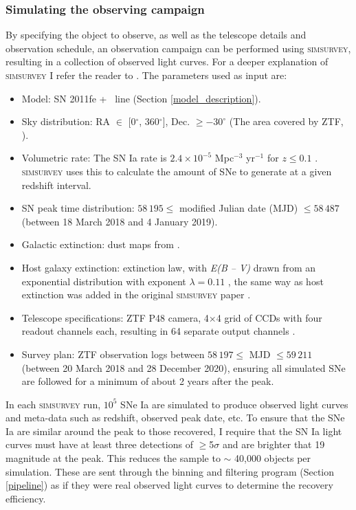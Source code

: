 \documentclass[a4paper,oneside,12pt, class=Latex/Classes/PhDthesisPSnPDF, crop=false]{standalone}
\begin{document}
\subsubsection{Simulating the observing campaign}
\label{sim_obs}
By specifying the object to observe, as well as the telescope details and observation schedule, an observation campaign can be performed using \textsc{simsurvey}, resulting in a collection of observed light curves. For a deeper explanation of \textsc{simsurvey} I refer the reader to \cite{simsurvey_main}. The parameters used as input are:

\begin{itemize}
 \item Model: SN 2011fe + \Halpha~line (Section \ref{model_description}).
 \item Sky distribution: RA $\in$ [0$^{\circ}$, 360$^{\circ}$], Dec. $\geq -30^{\circ}$ (The area covered by ZTF, \citealt{ZTF_Surveys_Scheduler}).
 \item Volumetric rate: The SN Ia rate is $2.4\times10^{-5}$ Mpc$^{-3}$ yr$^{-1}$ for $z \leq 0.1$ \citep{SNIa_rate}. \textsc{simsurvey} uses this to calculate the amount of SNe to generate at a given redshift interval.
 \item SN peak time distribution: $58\,195 \leq$ modified Julian date (MJD) $\leq 58\,487$ (between 18 March 2018 and 4 January 2019).
 \item Galactic extinction: dust maps from \citet{SFD98_dust_maps}.
 \item Host galaxy extinction: \citet{ccm89_extinction_law} extinction law, with \textit{E(B -- V)} drawn from an exponential distribution with exponent $\lambda=0.11$ \citep{EBV_simsurvey}, the same way as host extinction was added in the original \textsc{simsurvey} paper \citep{simsurvey_main}.
 \item Telescope specifications: ZTF P48 camera, 4$\times$4 grid of CCDs with four readout channels each, resulting in 64 separate output channels \citep{ZTF_Observing_System}.
 \item Survey plan: ZTF observation logs between $58\,197\leq$ MJD $\leq 59\,211$ (between 20 March 2018 and 28 December 2020), ensuring all simulated SNe are followed for a minimum of about 2 years after the peak.
\end{itemize}

In each \textsc{simsurvey} run, $10^5$ SNe Ia are simulated to produce observed light curves and meta-data such as redshift, observed peak date, etc. To ensure that the SNe Ia are similar around the peak to those recovered, I require that the SN Ia light curves must have at least three detections of $\geq$5$\sigma$ and are brighter that 19 magnitude at the peak. This reduces the sample to $\sim$ 40,000 objects per simulation. These are sent through the binning and filtering program (Section \ref{pipeline}) as if they were real observed light curves to determine the recovery efficiency.
\end{document}
